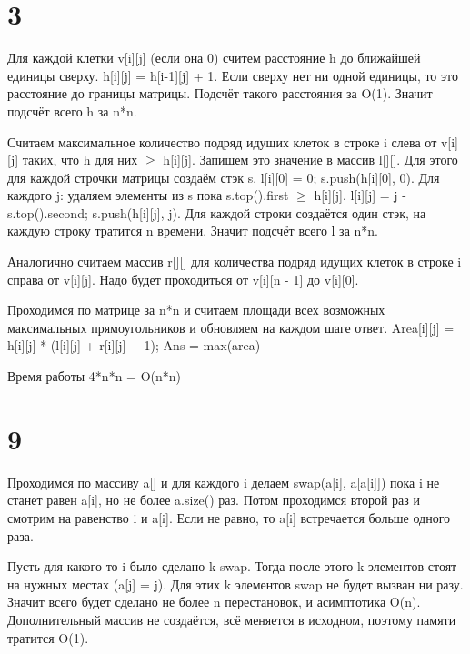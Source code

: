 \documentclass[12pt]{extarticle}
\begin{document}
\section*{3}
Для каждой клетки v[i][j] (если она 0) считем расстояние h до ближайшей единицы сверху. h[i][j] = h[i-1][j] + 1. Если сверху нет ни одной единицы, то это расстояние до границы матрицы. Подсчёт такого расстояния за O(1). Значит подсчёт всего h за n*n.

Считаем максимальное количество подряд идущих клеток в строке i слева от v[i][j] таких, что h для них $\ge$ h[i][j]. Запишем это значение в массив l[][]. Для этого для каждой строчки матрицы создаём стэк s. l[i][0] = 0; s.push({h[i][0], 0}). Для каждого j: удаляем элементы из s пока s.top().first $\ge$ h[i][j]. l[i][j] = j - s.top().second; s.push({h[i][j], j}). Для каждой строки создаётся один стэк, на каждую строку тратится n времени. Значит подсчёт всего l за n*n.

Аналогично считаем массив r[][] для количества подряд идущих клеток в строке i справа от v[i][j]. Надо будет проходиться от v[i][n - 1] до v[i][0].

Проходимся по матрице за n*n и считаем площади всех возможных максимальных прямоугольников и обновляем на каждом шаге ответ. Area[i][j] = h[i][j] * (l[i][j] + r[i][j] + 1); Ans = max(area)

Время работы 4*n*n = O(n*n)

\section*{9}
Проходимся по массиву a[] и для каждого i делаем swap(a[i], a[a[i]]) пока i не станет равен a[i], но не более a.size() раз. Потом проходимся второй раз и смотрим на равенство i и a[i]. Если не равно, то a[i] встречается больше одного раза.

Пусть для какого-то i было сделано k swap. Тогда после этого k элементов стоят на нужных местах (a[j] = j). Для этих k элементов swap не будет вызван ни разу. Значит всего будет сделано не более n перестановок, и асимптотика O(n). Дополнительный массив не создаётся, всё меняется в исходном, поэтому памяти тратится O(1).
\end{document}
